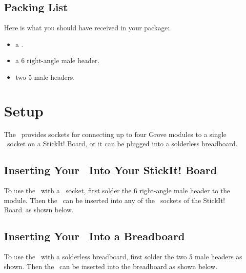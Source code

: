\documentclass[letterpaper,11pt,oneside]{memoir}
\newcommand{\xula}{XuLA Board}
\newcommand{\stickit}{StickIt! Board}
\begin{document}


\section{Packing List}

Here is what you should have received in your package:

\begin{itemize}
	\item a \product.
	\item a 6 right-angle male header.
	\item two 5 male headers.
\end{itemize}



\chapter{Setup}

The \product\ provides sockets for connecting up to four Grove modules to
a single \digpmod\ socket on a \stickit, or it can be plugged into a solderless breadboard.

\section{Inserting Your \texorpdfstring{\product}{StickIt! Grove}\ Into Your \texorpdfstring{\stickit}{StickIt! Board}}

To use the \product\ with a \digpmod\ socket, first solder the 6 right-angle male header to the module.
Then the \product\ can be inserted into any of the \digpmod\ sockets of the \stickit\ as shown below.


\section{Inserting Your \texorpdfstring{\product}{StickIt! Grove}\ Into a Breadboard}

To use the \product\ with a solderless breadboard, first solder the two 5 male headers as shown.
Then the \product\ can be inserted into the breadboard as shown below.
\end{document}
